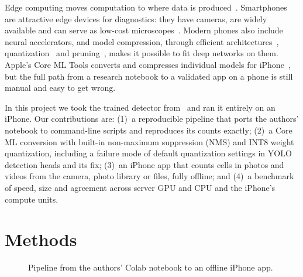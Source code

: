 \documentclass[conference]{IEEEtran}
\begin{document}
Edge computing moves computation to where data is produced~\cite{shi2016}. Smartphones are attractive edge devices for diagnostics: they have cameras, are widely available and can serve as low-cost microscopes~\cite{zhu2011}. Modern phones also include neural accelerators, and model compression, through efficient architectures~\cite{howard2017}, quantization~\cite{jacob2018,nagel2021} and pruning~\cite{han2016}, makes it possible to fit deep networks on them. Apple's Core ML Tools converts and compresses individual models for iPhone~\cite{coremlquant}, but the full path from a research notebook to a validated app on a phone is still manual and easy to get wrong.

In this project we took the trained detector from~\cite{dixit2025} and ran it entirely on an iPhone. Our contributions are: (1)~a reproducible pipeline that ports the authors' notebook to command-line scripts and reproduces its counts exactly; (2)~a Core ML conversion with built-in non-maximum suppression (NMS) and INT8 weight quantization, including a failure mode of default quantization settings in YOLO detection heads and its fix; (3)~an iPhone app that counts cells in photos and videos from the camera, photo library or files, fully offline; and (4)~a benchmark of speed, size and agreement across server GPU and CPU and the iPhone's compute units.

\section{Methods}

\begin{figure}[t]
\centering
{}
\caption{Pipeline from the authors' Colab notebook to an offline iPhone app.}
\label{fig:pipeline}
\end{figure}
\end{document}
